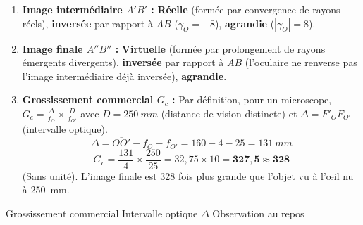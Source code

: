 \documentclass[11pt]{article}
\newcommand{\cle}[1]{{\popxbold\color{popdark}#1}}
\begin{document}
\begin{exoresolu}
\begin{enumerate}
    \item \textbf{Image intermédiaire $A'B'$ :} \textbf{Réelle} (formée par convergence de rayons réels), \textbf{inversée} par rapport à $AB$ ($\gamma_O = -8$), \textbf{agrandie} ($|\gamma_O| = 8$).
    \item \textbf{Image finale $A''B''$ :} \textbf{Virtuelle} (formée par prolongement de rayons émergents divergents), \textbf{inversée} par rapport à $AB$ (l'oculaire ne renverse pas l'image intermédiaire déjà inversée), \textbf{agrandie}.
    \item \textbf{Grossissement commercial $G_c$ :} Par définition, pour un microscope, $G_c = \frac{\Delta}{f_O} \times \frac{D}{f_{O'}}$ avec $D = \SI{250}{mm}$ (distance de vision distincte) et $\Delta = \overline{F'_O F_{O'}}$ (intervalle optique).
    \[ \Delta = \overline{OO'} - f_O - f_{O'} = 160 - 4 - 25 = \SI{131}{mm} \]
    \[ G_c = \frac{131}{4} \times \frac{250}{25} = 32,75 \times 10 = \mathbf{327,5} \approx \mathbf{328} \]
    (Sans unité). L'image finale est 328 fois plus grande que l'objet vu à l'œil nu à \SI{250}{mm}.
\end{enumerate}
\cle{Grossissement commercial} \cle{Intervalle optique $\Delta$} \cle{Observation au repos}
\end{exoresolu}
\end{document}
